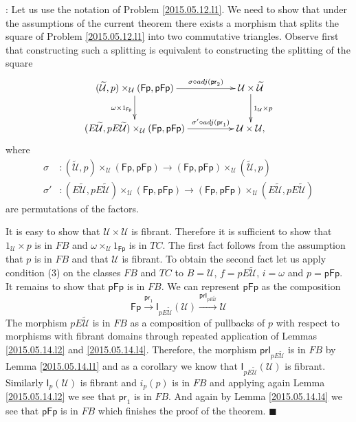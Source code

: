 \documentclass[12pt]{article}
\numberwithin{equation}{section}
\newenvironment{myproof}{{\bf Proof}:}{$\blacksquare$ \vskip 5mm }
\newcommand{\sr}{\rightarrow}
\newcommand{\wt}{\widetilde}
\newcommand{\id}{1}            %
\newcommand{\U}{\mathcal{U}}
\newcommand{\I}{\mathsf{I}}
\newcommand{\Fp}{\mathsf{Fp}}
\newcommand{\pFp}{\mathsf{pFp}}
\newcommand{\pr}{\mathsf{pr}}
\newcommand{\prI}{\mathsf{prI}}
\begin{document}
\begin{myproof}
Let us use the notation of Problem \ref{2015.05.12.l1}. We need to show that
under the assumptions of the current theorem there exists a morphism that
splits the square of Problem \ref{2015.05.12.l1} into two commutative
triangles. Observe first that constructing such a splitting is equivalent to
constructing the splitting of the square
%
$$
\begin{xy}
          \xymatrix@C=4pc{ (\wt{\U},p)\times_\U (\Fp,\pFp) \ar[r]^-{\sigma\circ
              adj(\pr_2)} \ar[d]_{\omega \times \id_{\Fp}} & \U\times\wt{\U}
            \ar[d]^{\id_\U\times p}\\ (E\wt{\U},pE\wt{\U})\times_\U (\Fp,\pFp)
            \ar[r]^-{\sigma'\circ adj(\pr_1)} & \U\times \U, }
\end{xy}
$$
%
where
%
\begin{align*}
  \sigma & :(\wt{\U},p)\times_\U (\Fp,\pFp)\sr (\Fp,\pFp)\times_\U (\wt{\U},p) \\
  \sigma'& :(E\wt{\U},pE\wt{\U})\times_\U (\Fp,\pFp) \sr (\Fp,\pFp) \times_\U (E\wt{\U},pE\wt{\U})
\end{align*}
%
are permutations of the factors.

It is easy to show that $\U\times \U$ is fibrant. Therefore it is sufficient to
show that $\id_\U\times p$ is in $FB$ and $\omega\times_\U \id_{\Fp}$ is in
$TC$. The first fact follows from the assumption that $p$ is in $FB$ and that
$\U$ is fibrant. To obtain the second fact let us apply condition (3) on the
classes $FB$ and $TC$ to $B=\U$, $f=pE\wt{\U}$, $i=\omega$ and $p=\pFp$.  It
remains to show that $\pFp$ is in $FB$. We can represent $\pFp$ as the
composition
%
$$\Fp\stackrel{\pr_1}{\sr} \I_{pE\wt{\U}}(\U) \stackrel{\prI_{pE\wt{\U}}}{\sr} \U$$
%
The morphism $pE\wt{\U}$ is in $FB$ as a composition of pullbacks of $p$ with
respect to morphisms with fibrant domains through repeated application of
Lemmas \ref{2015.05.14.l2} and \ref{2015.05.14.l4}. Therefore, the morphism
$\prI_{pE\wt{\U}}$ is in $FB$ by Lemma \ref{2015.05.14.l1} and as a corollary we
know that $\I_{pE\wt{\U}}(\U)$ is fibrant. Similarly $\I_p(\U)$ is fibrant and
$i_p(p)$ is in $FB$ and applying again Lemma \ref{2015.05.14.l2} we see that
$\pr_1$ is in $FB$. And again by Lemma \ref{2015.05.14.l4} we see that $\pFp$ is
in $FB$ which finishes the proof of the theorem.
\end{myproof}
%
\end{document}
